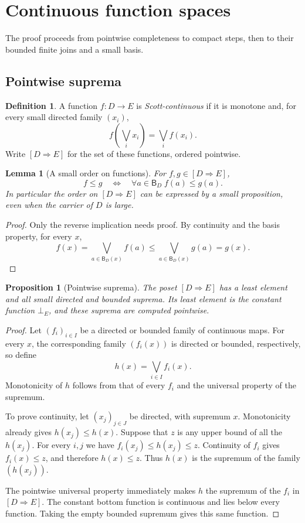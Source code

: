\documentclass[11pt,a4paper]{article}
\newtheorem{lemma}[theorem]{Lemma}
\newtheorem{proposition}[theorem]{Proposition}
\theoremstyle{definition}
\newtheorem{definition}[theorem]{Definition}
\theoremstyle{remark}
\newcommand{\B}{\mathsf B}
\newcommand{\Cont}[2]{[#1\mathbin{\Rightarrow}#2]}
\newcommand{\lub}{\bigvee}
\begin{document}
\section{Continuous function spaces}\label{sec:function-space}

The proof proceeds from pointwise completeness to compact steps,
then to their bounded finite joins and a small basis.

\subsection{Pointwise suprema}

\begin{definition}
A function $f:D\to E$ is \emph{Scott-continuous} if it is monotone and,
for every small directed family $(x_i)$,
\[
 f\left(\lub_i x_i\right)=\lub_i f(x_i).
\]
Write $\Cont D E$ for the set of these functions, ordered pointwise.
\end{definition}

\begin{lemma}[A small order on functions]\label{lem:smallorder}
For $f,g\in\Cont D E$,
\[
 f\leq g
 \quad\Longleftrightarrow\quad
 \forall a\in\B_D\; f(a)\leq g(a).
\]
In particular the order on $\Cont D E$ can be expressed by a small
proposition, even when the carrier of $D$ is large.
\end{lemma}
\begin{proof}
Only the reverse implication needs proof. By continuity and the basis
property, for every $x$,
\[
 f(x)=\lub_{a\in\B_D(x)} f(a)
 \leq\lub_{a\in\B_D(x)} g(a)=g(x).
\]
\end{proof}

\begin{proposition}[Pointwise suprema]\label{prop:pointwise}
The poset $\Cont D E$ has a least element and all small directed and
bounded suprema. Its least element is the constant function $\bot_E$,
and these suprema are computed pointwise.
\end{proposition}
\begin{proof}
Let $(f_i)_{i\in I}$ be a directed or bounded family of continuous maps.
For every $x$, the corresponding family $(f_i(x))$ is directed or bounded,
respectively, so define
\[
 h(x)=\lub_{i\in I}f_i(x).
\]
Monotonicity of $h$ follows from that of every $f_i$ and the universal
property of the supremum.

To prove continuity, let $(x_j)_{j\in J}$ be directed, with supremum $x$.
Monotonicity already gives $h(x_j)\leq h(x)$. Suppose that $z$ is any upper
bound of all the $h(x_j)$. For every $i,j$ we have
$f_i(x_j)\leq h(x_j)\leq z$. Continuity of $f_i$ gives $f_i(x)\leq z$,
and therefore $h(x)\leq z$. Thus $h(x)$ is the supremum of the family
$(h(x_j))$.

The pointwise universal property immediately makes $h$ the supremum of
the $f_i$ in $\Cont D E$. The constant bottom function is continuous
and lies below every function. Taking the empty bounded supremum gives
this same function.
\end{proof}
\end{document}
